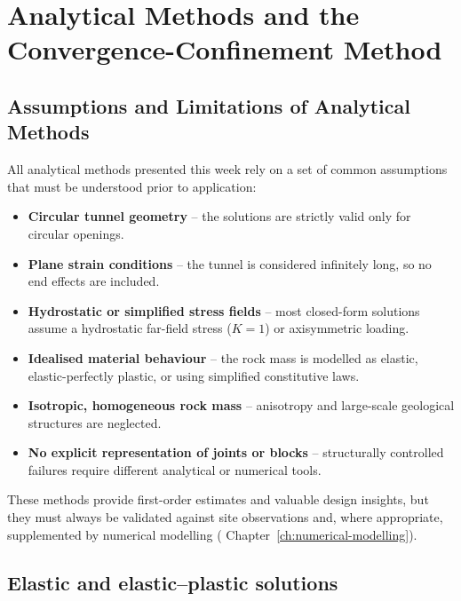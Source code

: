 \chapter{Analytical Methods and the Convergence-Confinement Method}
\label{ch:ccm}

\section{Assumptions and Limitations of Analytical Methods}
All analytical methods presented this week rely on a set of common assumptions that must be understood prior to application:

\begin{itemize}
 \item \textbf{Circular tunnel geometry} -- the solutions are strictly valid only for circular openings.
 \item \textbf{Plane strain conditions} -- the tunnel is considered infinitely long, so no end effects are included.
 \item \textbf{Hydrostatic or simplified stress fields} -- most closed-form solutions assume a hydrostatic far-field stress ($K=1$) or axisymmetric loading.
 \item \textbf{Idealised material behaviour} -- the rock mass is modelled as elastic, elastic-perfectly plastic, or using simplified constitutive laws.
 \item \textbf{Isotropic, homogeneous rock mass} -- anisotropy and large-scale geological structures are neglected.
 \item \textbf{No explicit representation of joints or blocks} -- structurally controlled failures require different analytical or numerical tools.
\end{itemize}

These methods provide first-order estimates and valuable design insights, but they must always be validated against site observations and, where appropriate, supplemented by numerical modelling ( Chapter~\ref{ch:numerical-modelling}).

\section{Elastic and elastic--plastic solutions}
\label{sec:elastic-and-elastic-plastic-solutions}

